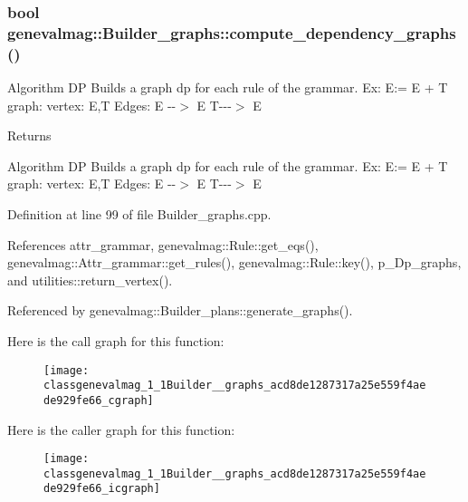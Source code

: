 \hypertarget{classgenevalmag_1_1Builder__graphs_acd8de1287317a25e559f4aede929fe66}{
\subsubsection[{compute\_\-dependency\_\-graphs}]{\setlength{\rightskip}{0pt plus 5cm}bool genevalmag::Builder\_\-graphs::compute\_\-dependency\_\-graphs ()}}
\label{classgenevalmag_1_1Builder__graphs_acd8de1287317a25e559f4aede929fe66}
Algorithm DP Builds a graph dp for each rule of the grammar. Ex: E:= E + T graph: vertex: E,T Edges: E -\/-\/$>$ E T-\/-\/-\/$>$ E \begin{DoxyReturn}{Returns}

\end{DoxyReturn}
Algorithm DP Builds a graph dp for each rule of the grammar. Ex: E:= E + T graph: vertex: E,T Edges: E -\/-\/$>$ E T-\/-\/-\/$>$ E 

Definition at line 99 of file Builder\_\-graphs.cpp.



References attr\_\-grammar, genevalmag::Rule::get\_\-eqs(), genevalmag::Attr\_\-grammar::get\_\-rules(), genevalmag::Rule::key(), p\_\-Dp\_\-graphs, and utilities::return\_\-vertex().



Referenced by genevalmag::Builder\_\-plans::generate\_\-graphs().



Here is the call graph for this function:\nopagebreak
\begin{figure}[H]
\begin{center}
\leavevmode
\texttt{[image: classgenevalmag\_1\_1Builder\_\_graphs\_acd8de1287317a25e559f4aede929fe66\_cgraph]}
\end{center}
\end{figure}




Here is the caller graph for this function:\nopagebreak
\begin{figure}[H]
\begin{center}
\leavevmode
\texttt{[image: classgenevalmag\_1\_1Builder\_\_graphs\_acd8de1287317a25e559f4aede929fe66\_icgraph]}
\end{center}
\end{figure}


